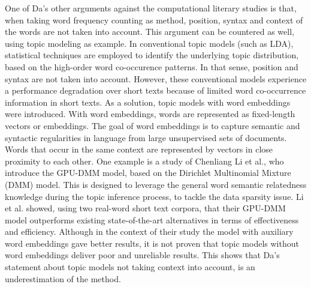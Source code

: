 One of Da's other arguments against the computational literary studies is that, when taking word frequency counting as method, position, syntax and context of the words are not taken into account.\autocite[611]{da_computational_2019} This argument can be countered as well, using topic modeling as example. In conventional topic models (such as LDA), statistical techniques are employed to identify the underlying topic distribution, based on the high-order word co-occurence patterns. In that sense, position and syntax are not taken into account. However, these conventional models experience a performance degradation over short texts because of limited word co-occurrence information in short texts. As a solution, topic models with word embeddings were introduced. With word embeddings, words are represented as fixed-length vectors or embeddings. The goal of word embeddings is to capture semantic and syntactic regularities in language from large unsupervised sets of documents. Words that occur in the same context are represented by vectors in close proximity to each other. One example is a study of Chenliang Li et al., who introduce the GPU-DMM model, based on the Dirichlet Multinomial Mixture (DMM) model. This is designed to leverage the general word semantic relatedness knowledge during the topic inference process, to tackle the data sparsity issue.\autocite[166]{li_topic_2016} Li et al. showed, using two real-word short text corpora, that their GPU-DMM model outperforms existing state-of-the-art alternatives in terms of effectiveness and efficiency.\autocite[173]{li_topic_2016} Although in the context of their study the model with auxiliary word embeddings gave better results, it is not proven that topic models without word embeddings deliver poor and unreliable results. This shows that Da's statement about topic models not taking context into account, is an underestimation of the method.


